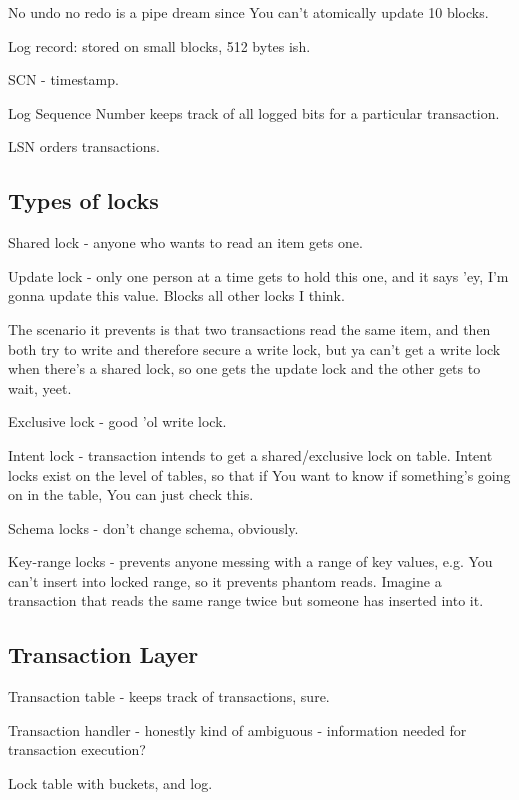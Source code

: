 \documentclass{article}
\begin{document}
		No undo no redo is a pipe dream since You can't atomically update 10 blocks.
		
		Log record: stored on small blocks, 512 bytes ish.
		
		SCN - timestamp.
		
		Log Sequence Number keeps track of all logged bits for a particular transaction.
		
		LSN orders transactions.
		
	\subsection{Types of locks}
	
		Shared lock - anyone who wants to read an item gets one.
		
		Update lock - only one person at a time gets to hold this one, and it says 'ey, I'm gonna update this value. Blocks all other locks I think.
		
		The scenario it prevents is that two transactions read the same item, and then both try to write and therefore secure a write lock, but ya can't get a write lock when there's a shared lock, so one gets the update lock and the other gets to wait, yeet.
		
		Exclusive lock - good 'ol write lock.
		
		Intent lock - transaction intends to get a shared/exclusive lock on table. Intent locks exist on the level of tables, so that if You want to know if something's going on in the table, You can just check this.
		
		Schema locks - don't change schema, obviously.
		
		Key-range locks - prevents anyone messing with a range of key values, e.g. You can't insert into locked range, so it prevents phantom reads. Imagine a transaction that reads the same range twice but someone has inserted into it.
		
	\subsection{Transaction Layer}
	
		Transaction table - keeps track of transactions, sure. 
		
		Transaction handler - honestly kind of ambiguous - information needed for transaction execution?
		
		Lock table with buckets, and log. 
		
		
		
		
		
\end{document}

